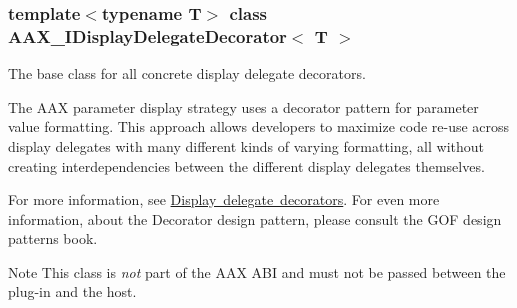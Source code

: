 \subsubsection*{template$<$typename T$>$\newline
class A\+A\+X\+\_\+\+I\+Display\+Delegate\+Decorator$<$ T $>$}

The base class for all concrete display delegate decorators. 

The A\+AX parameter display strategy uses a decorator pattern for parameter value formatting. This approach allows developers to maximize code re-\/use across display delegates with many different kinds of varying formatting, all without creating interdependencies between the different display delegates themselves.

For more information, see \mbox{\hyperlink{a00816_displaydelegates_decorators}{Display delegate decorators}}. For even more information, about the Decorator design pattern, please consult the G\+OF design patterns book.

\begin{DoxyNote}{Note}
This class is {\itshape not} part of the A\+AX A\+BI and must not be passed between the plug-\/in and the host. 
\end{DoxyNote}
